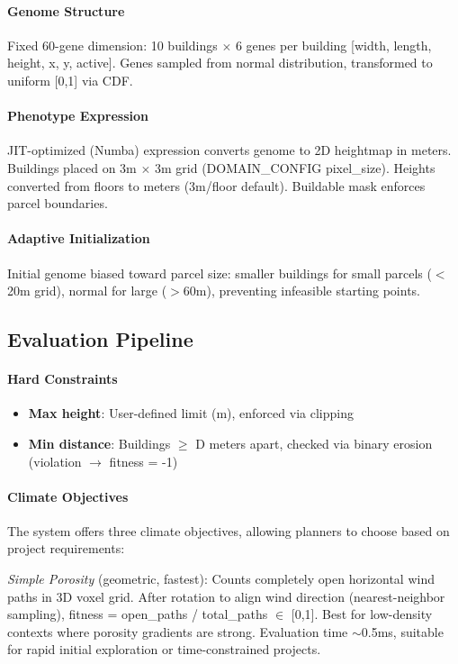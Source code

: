 \documentclass[times,final]{elsarticle}
\begin{document}
\paragraph{Genome Structure}
Fixed 60-gene dimension: 10 buildings $\times$ 6 genes per building [width, length, height, x, y, active]. Genes sampled from normal distribution, transformed to uniform [0,1] via CDF.

\paragraph{Phenotype Expression}
JIT-optimized (Numba) expression converts genome to 2D heightmap in meters. Buildings placed on 3m $\times$ 3m grid (DOMAIN\_CONFIG pixel\_size). Heights converted from floors to meters (3m/floor default). Buildable mask enforces parcel boundaries.

\paragraph{Adaptive Initialization}
Initial genome biased toward parcel size: smaller buildings for small parcels ($<$20m grid), normal for large ($>$60m), preventing infeasible starting points.

\subsection{Evaluation Pipeline}

\paragraph{Hard Constraints}
\begin{itemize}
\item \textbf{Max height}: User-defined limit (m), enforced via clipping
\item \textbf{Min distance}: Buildings $\geq$ D meters apart, checked via binary erosion (violation $\rightarrow$ fitness = -1)
\end{itemize}

\paragraph{Climate Objectives}
The system offers three climate objectives, allowing planners to choose based on project requirements:

\textit{Simple Porosity} (geometric, fastest): Counts completely open horizontal wind paths in 3D voxel grid. After rotation to align wind direction (nearest-neighbor sampling), fitness = open\_paths / total\_paths $\in$ [0,1]. Best for low-density contexts where porosity gradients are strong. Evaluation time $\sim$0.5ms, suitable for rapid initial exploration or time-constrained projects.
\end{document}
